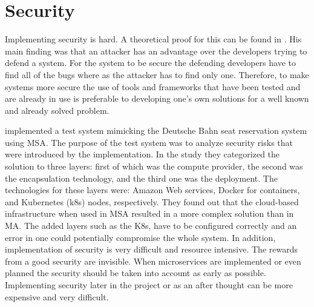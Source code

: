 

\section{Security}
\begin{sloppypar}
    Implementing security is hard. A theoretical proof for this can be found in
    \citet{andersson2001information}. His main finding was that an attacker has
    an advantage over the developers trying to defend a system. For the system
    to be secure the defending developers have to find all of the bugs where as
    the attacker has to find only one. Therefore, to make systems more secure
    the use of tools and frameworks that have been tested and are already in use
    is preferable to developing one's own solutions for a well known and already
    solved problem.
\end{sloppypar}
\begin{sloppypar}
    \citet{closer18} implemented a test system mimicking the Deutsche Bahn seat
    reservation system using MSA. The purpose of the test system was to analyze
    security risks that were introduced by the implementation. In the study they
    categorized the solution to three layers: first of which was the compute
    provider, the second was the encapsulation technology, and the third one was
    the deployment. The technologies for these layers were: Amazon Web services,
    Docker for containers, and Kubernetes (k8s) nodes, respectively. They found
    out that the cloud-based infrastructure when used in MSA resulted in a more
    complex solution than in MA. The added layers such as the K8s, have to be
    configured correctly and an error in one could potentially compromise the
    whole system. In addition, implementation of security is very difficult and
    resource intensive. The rewards from a good security are invisible. When
    microservices are implemented or even planned the security should be taken
    into account as early as possible. Implementing security later in the
    project or as an after thought can be more expensive and very difficult.
\end{sloppypar}





